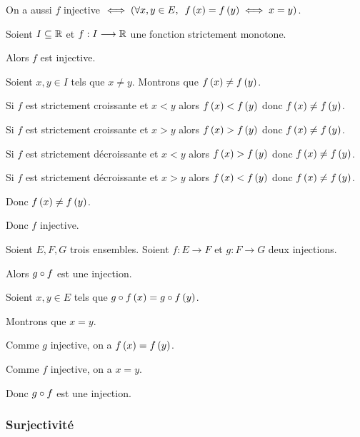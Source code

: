 \begin{rem}
On a aussi \(f\) injective \(\iff\paren{\quantifs{\forall x,y\in E}f\paren{x}=f\paren{y}\iff x=y}\).
\end{rem}

\begin{prop}
Soient \(I\subseteq\mathbb{R}\) et \(f:I\longrightarrow\mathbb{R}\) une fonction strictement monotone.

Alors \(f\) est injective.
\end{prop}

\begin{dem}
Soient \(x,y\in I\) tels que \(x\not=y\). Montrons que \(f\left(x\right)\not=f\left(y\right)\).

Si \(f\) est strictement croissante et \(x<y\) alors \(f\left(x\right)<f\left(y\right)\) donc \(f\left(x\right)\not=f\left(y\right)\).

Si \(f\) est strictement croissante et \(x>y\) alors \(f\left(x\right)>f\left(y\right)\) donc \(f\left(x\right)\not=f\left(y\right)\).

Si \(f\) est strictement décroissante et \(x<y\) alors \(f\left(x\right)>f\left(y\right)\) donc \(f\left(x\right)\not=f\left(y\right)\).

Si \(f\) est strictement décroissante et \(x>y\) alors \(f\left(x\right)<f\left(y\right)\) donc \(f\left(x\right)\not=f\left(y\right)\).

Donc \(f\left(x\right)\not=f\left(y\right)\).

Donc \(f\) injective.
\end{dem}

\begin{prop}
Soient \(E,F,G\) trois ensembles. Soient \(f:E\to F\) et \(g:F\to G\) deux injections.

Alors \(g\circ f\) est une injection.
\end{prop}

\begin{dem}
Soient \(x,y\in E\) tels que \(g\circ f\left(x\right)=g\circ f\left(y\right)\).

Montrons que \(x=y\).

Comme \(g\) injective, on a \(f\left(x\right)=f\left(y\right)\).

Comme \(f\) injective, on a \(x=y\).

Donc \(g\circ f\) est une injection.
\end{dem}

\subsubsection{Surjectivité}

